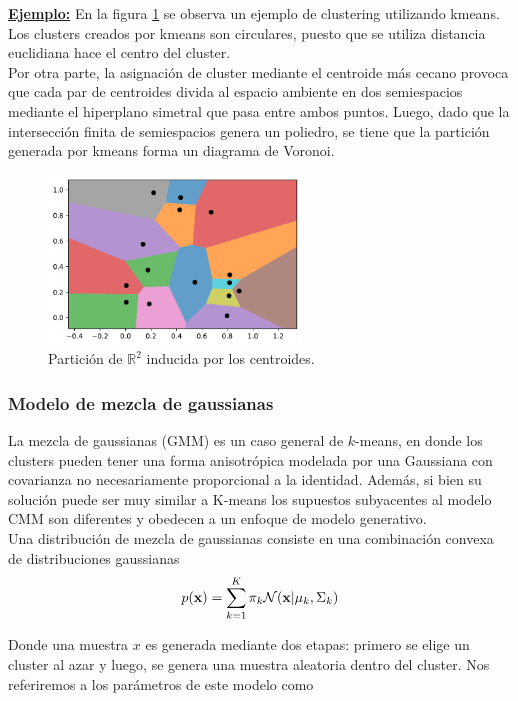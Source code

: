\underline{\textbf{Ejemplo:}} En la figura \ref{fig:kmeans} se observa un ejemplo de clustering utilizando kmeans. Los clusters creados por kmeans son circulares, puesto que se utiliza distancia euclidiana hace el centro del cluster.\\


Por otra parte, la asignación de cluster mediante el centroide más cecano provoca que cada par de centroides divida al espacio ambiente en dos semiespacios mediante el hiperplano simetral que pasa entre ambos puntos. Luego, dado que la intersección finita de semiespacios genera un poliedro, se tiene que la partición generada por kmeans forma un diagrama de Voronoi.

\begin{figure}[h]
  \centering
  \includegraphics[width=0.6\textwidth]{img/cap6_voronoi}
  \caption{Partición de $\mathbb{R}^2$ inducida por los centroides.}
  \label{fig:kmeans}
\end{figure}


\subsubsection{Modelo de mezcla de gaussianas}

La mezcla de gaussianas (GMM) es un caso general de $k$-means, en donde los clusters pueden tener una forma anisotrópica modelada por una Gaussiana con covarianza no necesariamente proporcional a la identidad. Además, si bien su solución puede ser muy similar a K-means los supuestos subyacentes al modelo CMM son diferentes y obedecen a un enfoque de modelo generativo. \\


Una distribución de mezcla de gaussianas consiste en una combinación convexa de distribuciones gaussianas
\begin{equation}
	p(\mathbf{x}) = \sum_{k=1}^K \pi_k \mathcal{N}(\mathbf{x}| \mu_k,\Sigma_k)
\end{equation}

Donde una muestra $x$ es generada mediante dos etapas: primero se elige un cluster al azar y luego, se genera una muestra aleatoria dentro del cluster. Nos referiremos a los parámetros de este modelo como 

